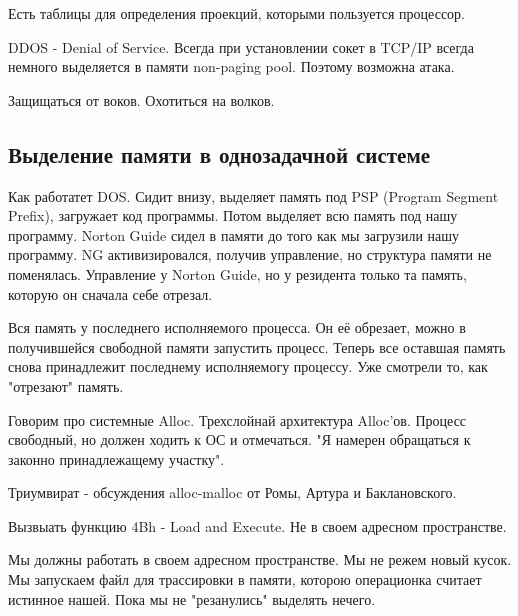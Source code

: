 Есть таблицы для определения проекций, которыми пользуется процессор.

DDOS - Denial of Service. Всегда при установлении сокет в TCP/IP всегда немного выделяется в памяти non-paging pool. Поэтому возможна атака.

\begin{off}Защищаться от воков. Охотиться на волков.\end{off} 

\subsection{Выделение памяти в однозадачной системе}
Как работатет DOS. Сидит внизу, выделяет память под PSP (Program Segment Prefix), загружает код программы. Потом выделяет всю память под нашу программу. Norton Guide сидел в памяти до того как мы загрузили нашу программу. NG активизировался, получив управление, но структура памяти не поменялась. Управление у Norton Guide, но у резидента только та память, которую он сначала себе отрезал.

Вся память у последнего исполняемого процесса. Он её обрезает, можно в получившейся свободной памяти запустить процесс. Теперь все оставшая память снова принадлежит последнему исполняемогу процессу. Уже смотрели то, как "отрезают" память.

Говорим про системные Alloc. Трехслойнай архитектура Alloc'ов. Процесс свободный, но должен ходить к ОС и отмечаться. "Я намерен обращаться к законно принадлежащему участку".

Триумвират - обсуждения alloc-malloc от Ромы, Артура и Баклановского.
 
Вызвыать функцию 4Bh - Load and Execute. Не в своем адресном пространстве.

Мы должны работать в своем адресном пространстве. Мы не режем новый кусок. Мы запускаем файл для трассировки в памяти, которою операционка считает истинное нашей. Пока мы не "резанулись" выделять нечего. 

